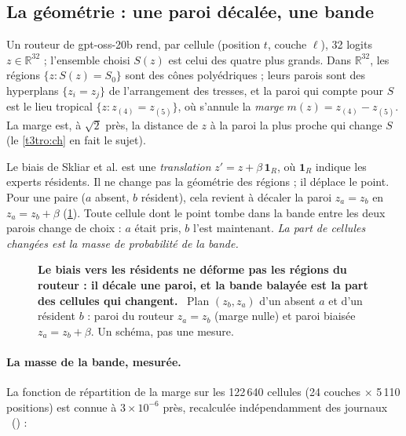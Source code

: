 \subsection{La géométrie : une paroi décalée, une bande}\label{t3mim:sec:p3-geometrie}

Un routeur de gpt-oss-20b rend, par cellule (position $t$, couche $\ell$), 32 logits $z \in \mathbb{R}^{32}$ ; l'ensemble choisi $S(z)$ est celui des quatre plus grands. Dans $\mathbb{R}^{32}$, les régions $\{z : S(z) = S_0\}$ sont des cônes polyédriques ; leurs parois sont des hyperplans $\{z_i = z_j\}$ de l'arrangement des tresses, et la paroi qui compte pour $S$ est le lieu tropical $\{z : z_{(4)} = z_{(5)}\}$, où s'annule la \emph{marge} $m(z) = z_{(4)} - z_{(5)}$. La marge est, à $\sqrt 2$ près, la distance de $z$ à la paroi la plus proche qui change $S$ (le \cref{t3tro:ch} en fait le sujet).

Le biais de Skliar et al. est une \emph{translation} $z' = z + \beta\,\mathbf{1}_R$, où $\mathbf{1}_R$ indique les experts résidents. Il ne change pas la géométrie des régions ; il déplace le point. Pour une paire ($a$ absent, $b$ résident), cela revient à décaler la paroi $z_a = z_b$ en $z_a = z_b + \beta$ (\cref{fig:t3-mim-p3-paroi}). Toute cellule dont le point tombe dans la bande entre les deux parois change de choix : $a$ était pris, $b$ l'est maintenant. \emph{La part de cellules changées est la masse de probabilité de la bande.}

\begin{figure}[tbp]
\centering
{}
\caption[P3 : la paroi du routeur décalée de $\beta$]{\textbf{Le biais vers les résidents ne déforme pas les régions du routeur : il décale une paroi, et la bande balayée est la part des cellules qui changent.} \schema~Plan $(z_b, z_a)$ d'un absent $a$ et d'un résident $b$ : paroi du routeur $z_a = z_b$ (marge nulle) et paroi biaisée $z_a = z_b + \beta$. Un schéma, pas une mesure. \HorsStyle{}}
\label{fig:t3-mim-p3-paroi}
\end{figure}

\paragraph{La masse de la bande, mesurée.} La fonction de répartition de la marge sur les 122\,640 cellules (24 couches $\times$ 5\,110 positions) est connue à $3 \times 10^{-6}$ près, recalculée indépendamment des journaux \mes~() :

